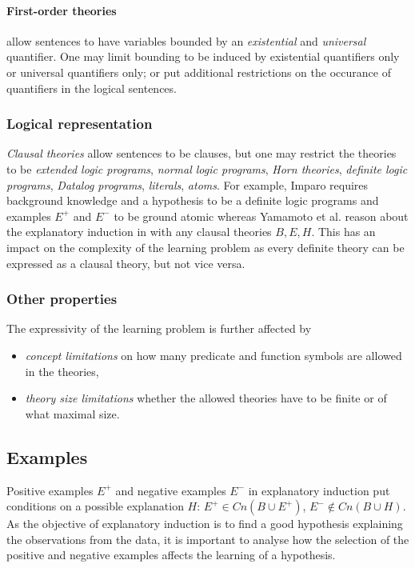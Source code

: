 \paragraph{First-order theories} allow sentences to have variables bounded by an \emph{existential} and \emph{universal} quantifier. One may limit bounding to be induced by existential quantifiers only or universal quantifiers only; or put additional restrictions on the occurance of quantifiers in the logical sentences.

\subsubsection{Logical representation}
\emph{Clausal theories} allow sentences to be clauses, but one may restrict the theories to be \emph{extended logic programs}, \emph{normal logic programs}, 
\emph{Horn theories}, \emph{definite logic programs}, \emph{Datalog programs}, \emph{literals}, \emph{atoms}. For example, Imparo\cite{kimber2012learning} requires background knowledge and a hypothesis to be a definite logic programs and examples $E^{+}$ and $E^{-}$ to be ground atomic whereas Yamamoto et al. reason about the explanatory induction in \cite{yamamoto2012inverse} with any clausal theories $B, E, H$. This has an impact on the complexity of the learning problem as every definite theory can be expressed as a clausal theory, but not vice versa.

\subsubsection{Other properties}
The expressivity of the learning problem is further affected by
\begin{itemize}
\item \emph{concept limitations} on how many predicate and function symbols are allowed in the theories,
\item \emph{theory size limitations} whether the allowed theories have to be finite or of what maximal size. 
\end{itemize}

\subsection{Examples}
Positive examples $E^{+}$ and negative examples $E^{-}$ in explanatory induction put conditions on a possible explanation $H$: $E^{+} \in Cn(B \cup E^{+})$, $E^{-} \not \in Cn(B \cup H)$. As the objective of explanatory induction is to find a good hypothesis explaining the observations from the data, it is important to analyse how the selection of the positive and negative examples affects the learning of a hypothesis.


